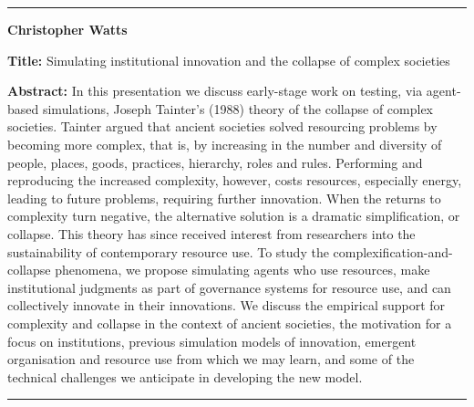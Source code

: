 \documentclass[]{article}
\begin{document}
\rule{4cm}{.4pt}

{\bf Christopher Watts}

\textbf{Title:} Simulating institutional innovation and the collapse of
complex societies

\textbf{Abstract:}
In this presentation we discuss early-stage work on testing, via agent-based simulations,
Joseph Tainter’s (1988) theory of the collapse of complex societies. Tainter argued that
ancient societies solved resourcing problems by becoming more complex, that is, by
increasing in the number and diversity of people, places, goods, practices, hierarchy, roles
and rules. Performing and reproducing the increased complexity, however, costs resources,
especially energy, leading to future problems, requiring further innovation. When the
returns to complexity turn negative, the alternative solution is a dramatic simplification, or
collapse. This theory has since received interest from researchers into the sustainability of
contemporary resource use. To study the complexification-and-collapse phenomena, we
propose simulating agents who use resources, make institutional judgments as part of
governance systems for resource use, and can collectively innovate in their innovations. We
discuss the empirical support for complexity and collapse in the context of ancient societies,
the motivation for a focus on institutions, previous simulation models of innovation,
emergent organisation and resource use from which we may learn, and some of the
technical challenges we anticipate in developing the new model.

\rule{4cm}{.4pt}

%
%
\end{document}
